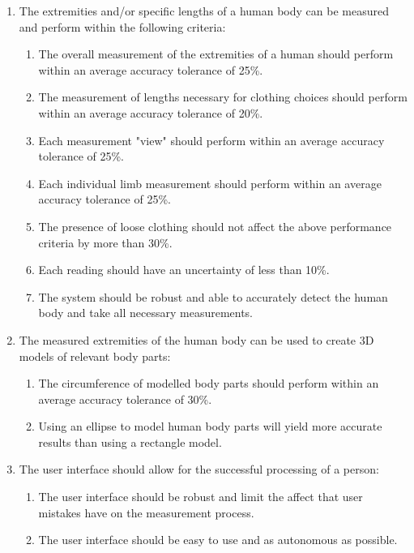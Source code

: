 \begin{enumerate}
	\item The extremities and/or specific lengths of a human body can be measured and perform within the following criteria:
	\begin{enumerate}
		\item The overall measurement of the extremities of a human should perform within an average accuracy tolerance of 25\%.
		\item The measurement of lengths necessary for clothing choices should perform within an average accuracy tolerance of 20\%.
		\item Each measurement "view" should perform within an average accuracy tolerance of 25\%.
		\item Each individual limb measurement should perform within an average accuracy tolerance of 25\%.
		\item The presence of loose clothing should not affect the above performance criteria by more than 30\%.
		\item Each reading should have an uncertainty of less than 10\%.
		\item The system should be robust and able to accurately detect the human body and take all necessary measurements. 
	\end{enumerate}
	\item The measured extremities of the human body can be used to create 3D models of relevant body parts: 
	\begin{enumerate}
		\item The circumference of modelled body parts should perform within an average accuracy tolerance of 30\%.
		\item Using an ellipse to model human body parts will yield more accurate results than using a rectangle model. 
	\end{enumerate}
	\item The user interface should allow for the successful processing of a person: 
	\begin{enumerate}
		\item The user interface should be robust and limit the affect that user mistakes have on the measurement process.
		\item The user interface should be easy to use and as autonomous as possible.
	\end{enumerate}
\end{enumerate}
